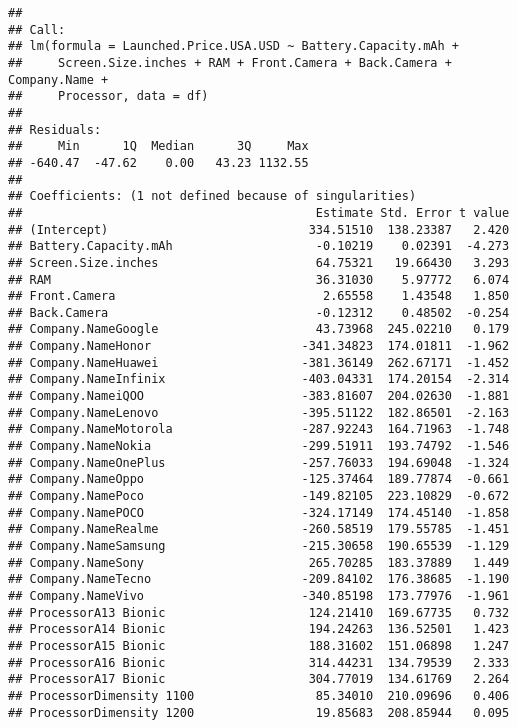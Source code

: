 \documentclass[
]{article}
\begin{document}
\begin{verbatim}
## 
## Call:
## lm(formula = Launched.Price.USA.USD ~ Battery.Capacity.mAh + 
##     Screen.Size.inches + RAM + Front.Camera + Back.Camera + Company.Name + 
##     Processor, data = df)
## 
## Residuals:
##     Min      1Q  Median      3Q     Max 
## -640.47  -47.62    0.00   43.23 1132.55 
## 
## Coefficients: (1 not defined because of singularities)
##                                         Estimate Std. Error t value
## (Intercept)                            334.51510  138.23387   2.420
## Battery.Capacity.mAh                    -0.10219    0.02391  -4.273
## Screen.Size.inches                      64.75321   19.66430   3.293
## RAM                                     36.31030    5.97772   6.074
## Front.Camera                             2.65558    1.43548   1.850
## Back.Camera                             -0.12312    0.48502  -0.254
## Company.NameGoogle                      43.73968  245.02210   0.179
## Company.NameHonor                     -341.34823  174.01811  -1.962
## Company.NameHuawei                    -381.36149  262.67171  -1.452
## Company.NameInfinix                   -403.04331  174.20154  -2.314
## Company.NameiQOO                      -383.81607  204.02630  -1.881
## Company.NameLenovo                    -395.51122  182.86501  -2.163
## Company.NameMotorola                  -287.92243  164.71963  -1.748
## Company.NameNokia                     -299.51911  193.74792  -1.546
## Company.NameOnePlus                   -257.76033  194.69048  -1.324
## Company.NameOppo                      -125.37464  189.77874  -0.661
## Company.NamePoco                      -149.82105  223.10829  -0.672
## Company.NamePOCO                      -324.17149  174.45140  -1.858
## Company.NameRealme                    -260.58519  179.55785  -1.451
## Company.NameSamsung                   -215.30658  190.65539  -1.129
## Company.NameSony                       265.70285  183.37889   1.449
## Company.NameTecno                     -209.84102  176.38685  -1.190
## Company.NameVivo                      -340.85198  173.77976  -1.961
## ProcessorA13 Bionic                    124.21410  169.67735   0.732
## ProcessorA14 Bionic                    194.24263  136.52501   1.423
## ProcessorA15 Bionic                    188.31602  151.06898   1.247
## ProcessorA16 Bionic                    314.44231  134.79539   2.333
## ProcessorA17 Bionic                    304.77019  134.61769   2.264
## ProcessorDimensity 1100                 85.34010  210.09696   0.406
## ProcessorDimensity 1200                 19.85683  208.85944   0.095

\end{verbatim}
\end{document}

